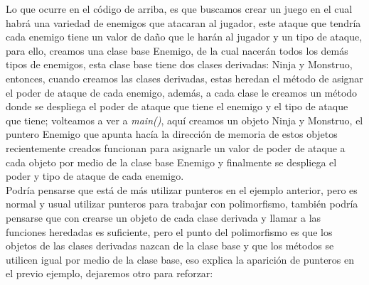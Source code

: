 Lo que ocurre en el código de arriba, es que buscamos crear un juego en el cual habrá una variedad de enemigos que atacaran al jugador, este ataque que tendría cada enemigo tiene un valor de daño que le harán al jugador y un tipo de ataque, para ello, creamos una clase base Enemigo, de la cual nacerán todos los demás tipos de enemigos, esta clase base tiene dos clases derivadas: Ninja y Monstruo, entonces, cuando creamos las clases derivadas, estas heredan el método de asignar el poder de ataque de cada enemigo, además, a cada clase le creamos un método donde se despliega el poder de ataque que tiene el enemigo y el tipo de ataque que tiene; volteamos a ver a \textit{main()}, aquí creamos un objeto Ninja y Monstruo, el puntero Enemigo que apunta hacía la dirección de memoria de estos objetos recientemente creados funcionan para asignarle un valor de poder de ataque a cada objeto por medio de la clase base Enemigo y finalmente se despliega el poder y tipo de ataque de cada enemigo.\\
Podría pensarse que está de más utilizar punteros en el ejemplo anterior, pero es normal y usual utilizar punteros para trabajar con polimorfismo, también podría pensarse que con crearse un objeto de cada clase derivada y llamar a las funciones heredadas es suficiente, pero el punto del polimorfismo es que los objetos de las clases derivadas nazcan de la clase base y que los métodos se utilicen igual por medio de la clase base, eso explica la aparición de punteros en el previo ejemplo, dejaremos otro para reforzar:

